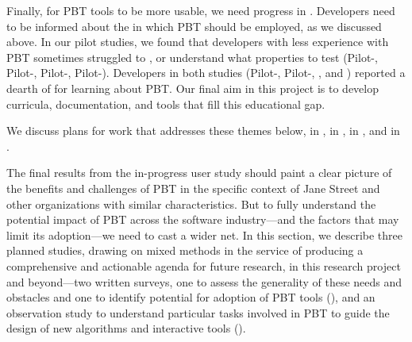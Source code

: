 Finally, for PBT tools to be more usable, we need progress in
. Developers need to be informed about the  in which PBT should be employed, as we discussed above.
In our pilot studies, we found that developers with less experience with PBT
sometimes struggled to , or understand what properties to test (Pilot-,
Pilot-,
Pilot-, Pilot-). Developers in both studies
(Pilot-, Pilot-, , and
) reported a dearth of  for
learning about PBT. Our final aim in this project is to develop curricula,
documentation, and tools that fill this educational gap.

We discuss plans for work that addresses these themes below,  in ,  in
,
   in , and  in .

\iflater
{}
\fi



The final results from the in-progress user study should paint a clear
picture of the benefits and challenges of PBT in the specific context
of Jane Street and other organizations with similar characteristics.  But to
fully understand the potential impact of PBT across the software
industry---and the factors that may limit its adoption---we need to
cast a wider net.
%
In this section, we describe three planned studies, drawing on mixed
methods in the service of producing a comprehensive and actionable
agenda for future research, in this research project and beyond---two
written surveys, one to assess the generality of these needs and obstacles
and one to identify potential for adoption of PBT tools
(), and an observation study to understand
particular tasks involved in PBT to guide the design of new algorithms
and interactive tools ().

